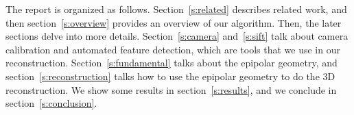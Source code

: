 The report is organized as follows. Section~\ref{s:related} describes related work, and then section~\ref{s:overview} provides an overview of our algorithm. Then, the later sections delve into more details. Section~\ref{s:camera} and~\ref{s:sift} talk about camera calibration and automated feature detection, which are tools that we use in our reconstruction. Section~\ref{s:fundamental} talks about the epipolar geometry, and section~\ref{s:reconstruction} talks how to use the epipolar geometry to do the 3D reconstruction. We show some results in section~\ref{s:results}, and we conclude in section~\ref{s:conclusion}.

